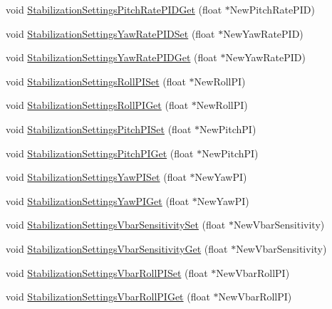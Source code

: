 \begin{DoxyCompactItemize}
void \hyperlink{group___stabilization_settings_ga2a7940a6acc1291cfa9a447db3da843e}{\-Stabilization\-Settings\-Pitch\-Rate\-P\-I\-D\-Get} (float $\ast$\-New\-Pitch\-Rate\-P\-I\-D)
\item 
void \hyperlink{group___stabilization_settings_gadf66275ff64016eea5116e6df634aee8}{\-Stabilization\-Settings\-Yaw\-Rate\-P\-I\-D\-Set} (float $\ast$\-New\-Yaw\-Rate\-P\-I\-D)
\item 
void \hyperlink{group___stabilization_settings_gaef673c7bcfa7ae791d82a688fe965e12}{\-Stabilization\-Settings\-Yaw\-Rate\-P\-I\-D\-Get} (float $\ast$\-New\-Yaw\-Rate\-P\-I\-D)
\item 
void \hyperlink{group___stabilization_settings_gaa80e1c645339f743943c8edf52a748b6}{\-Stabilization\-Settings\-Roll\-P\-I\-Set} (float $\ast$\-New\-Roll\-P\-I)
\item 
void \hyperlink{group___stabilization_settings_gabfa980573dfe9b270a5580484d6ceb27}{\-Stabilization\-Settings\-Roll\-P\-I\-Get} (float $\ast$\-New\-Roll\-P\-I)
\item 
void \hyperlink{group___stabilization_settings_gad4ef483d173e8f1d3153e2ec833d64b4}{\-Stabilization\-Settings\-Pitch\-P\-I\-Set} (float $\ast$\-New\-Pitch\-P\-I)
\item 
void \hyperlink{group___stabilization_settings_gaa65f73dcbac4af1aba254bb9a6170e4f}{\-Stabilization\-Settings\-Pitch\-P\-I\-Get} (float $\ast$\-New\-Pitch\-P\-I)
\item 
void \hyperlink{group___stabilization_settings_ga8be7e810de8abef0678e71e4897c75cf}{\-Stabilization\-Settings\-Yaw\-P\-I\-Set} (float $\ast$\-New\-Yaw\-P\-I)
\item 
void \hyperlink{group___stabilization_settings_ga32274ed293e31865a6e3a12e52d6d829}{\-Stabilization\-Settings\-Yaw\-P\-I\-Get} (float $\ast$\-New\-Yaw\-P\-I)
\item 
void \hyperlink{group___stabilization_settings_gaf394dd0983a9b48aa0538fa3f6357d09}{\-Stabilization\-Settings\-Vbar\-Sensitivity\-Set} (float $\ast$\-New\-Vbar\-Sensitivity)
\item 
void \hyperlink{group___stabilization_settings_gadcdcfb58ce2164040d1ca29000130884}{\-Stabilization\-Settings\-Vbar\-Sensitivity\-Get} (float $\ast$\-New\-Vbar\-Sensitivity)
\item 
void \hyperlink{group___stabilization_settings_ga9858457a1773e65b38f00397895d437b}{\-Stabilization\-Settings\-Vbar\-Roll\-P\-I\-Set} (float $\ast$\-New\-Vbar\-Roll\-P\-I)
\item 
void \hyperlink{group___stabilization_settings_ga8a15e47a1996911a1833a8eb4104cc48}{\-Stabilization\-Settings\-Vbar\-Roll\-P\-I\-Get} (float $\ast$\-New\-Vbar\-Roll\-P\-I)

\end{DoxyCompactItemize}
